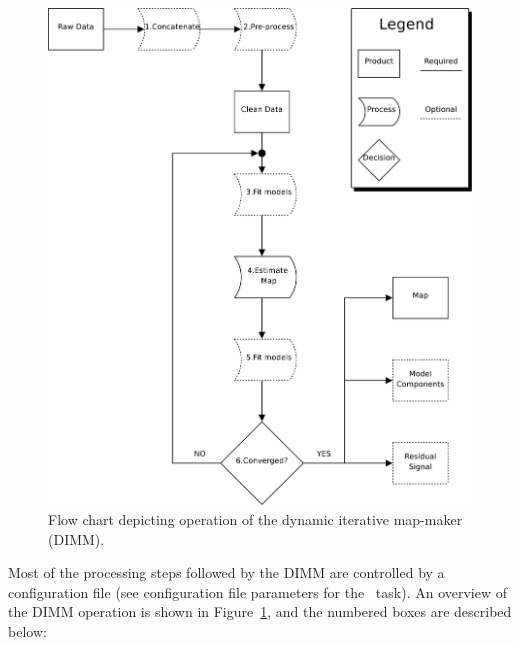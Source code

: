 \documentclass[oneside,11pt]{starlink}
\begin{document}
\begin{figure}
\begin{center}
\includegraphics[width=\linewidth]{sun258_dimm_flow}
\caption{Flow chart depicting operation of the dynamic iterative
  map-maker (DIMM).}
\label{fig:dimm_flow}
\end{center}
\end{figure}

Most of the processing steps followed by the DIMM are controlled by a
configuration file (see configuration file parameters for the
\makemap\ task). An overview of the DIMM operation is shown in
Figure~\ref{fig:dimm_flow}, and the numbered boxes are described
below:
\end{document}
